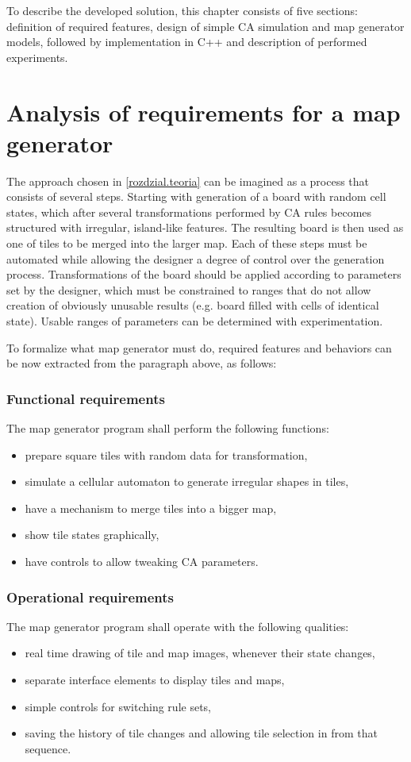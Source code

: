 \documentclass[12pt]{report}
\begin{document}
To describe the developed solution, this chapter consists of five sections: definition of required features, design of simple CA simulation and map generator models, followed by implementation in C++ and description of performed experiments. 

\section{Analysis of requirements for a map generator}

The approach chosen in \cref{rozdzial.teoria} can be imagined as a process that consists of several steps. Starting with generation of a board with random cell states, which after several transformations performed by CA rules becomes structured with irregular, island-like features. The resulting board is then used as one of tiles to be merged into the larger map. Each of these steps must be automated while allowing the designer a degree of control over the generation process. Transformations of the board should be applied according to parameters set by the designer, which must be constrained to ranges that do not allow creation of obviously unusable results (e.g. board filled with cells of identical state). Usable ranges of parameters can be determined with experimentation. 

To formalize what map generator must do, required features and behaviors can be now extracted from the paragraph above, as follows:
 
\subsubsection{Functional requirements}

The map generator program shall perform the following functions:
\begin{itemize}
	\item prepare square tiles with random data for transformation,
	\item simulate a cellular automaton to generate irregular shapes in tiles,
	\item have a mechanism to merge tiles into a bigger map,
	\item show tile states graphically,
	\item have controls to allow tweaking CA parameters.
\end{itemize} 


\subsubsection{Operational requirements}
The map generator program shall operate with the following qualities:
\begin{itemize}
	\item real time drawing of tile and map images, whenever their state changes,
	\item separate interface elements to display tiles and maps,
	\item simple controls for switching rule sets,
	\item saving the history of tile changes and allowing tile selection in from that sequence.
\end{itemize}
\end{document}
